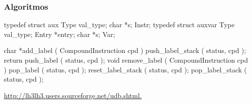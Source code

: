 \subsubsection{Algoritmos}
\label{subsec:subsubsection:algoritmos:desenho}













  typedef struct aux {
        Type val_type;
        char *s;
    } Instr;
    typedef struct auxvar {
        Type val_type;
        Entry *entry;
        char *s;
    } Var;


  char   *add_label ( CompoundInstruction cpd )
    {
        push_label_stack ( status, cpd );
        return push_label ( status, cpd );
    }
    void remove_label ( CompoundInstruction cpd )
    {
        pop_label ( status, cpd );
        reset_label_stack ( status, cpd );
        pop_label_stack ( status, cpd );
    }








\url{http://lh3lh3.users.sourceforge.net/udb.shtml.}
